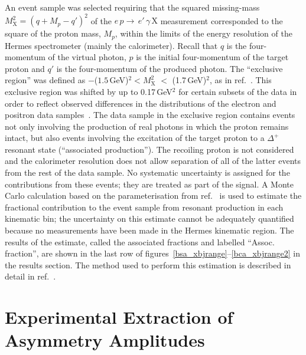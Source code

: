 \documentclass[11pt,a4paper]{article}
\begin{document}
An event sample was selected requiring
that the squared missing-mass $M_{\textrm{X}}^{2}=(q+M_{p}-q')^{2}$
of the $e\,p \rightarrow\, e'\,\gamma\, \textrm{X}$ measurement
corresponded to the square of the proton mass, $M_{p}$, within the limits of the
energy resolution of the H{\sc ermes} spectrometer (mainly the calorimeter). Recall that $q$ is the
four-momentum of the virtual photon, $p$ is the initial four-momentum
of the target proton and $q'$ is the four-momentum of the produced
photon. The ``exclusive region'' was defined as $-$($1.5$\,GeV)$^{2} <
M_{\textrm{X}}^{2}$ $<$ (1.7\,GeV)$^{2}$, as in
ref.~\cite{Air09}. This exclusive region was shifted by up to
0.17\,GeV$^{2}$ for certain subsets of the data in order to reflect observed differences in the distributions of the electron and positron data samples~\cite{Bur10}. 
The data sample in the exclusive region contains events not only involving the production of real photons in which the proton remains intact, but also
events involving the excitation of the target proton to a $\Delta^+$
resonant state (``associated production''). The recoiling proton is not considered and the calorimeter resolution does not allow separation of all of the latter events from the rest of the data sample.
No systematic uncertainty is assigned for the contributions from these
events; they are treated as part of the signal. A Monte Carlo
calculation based on the parameterisation from ref.~\cite{Bra76} is
used to estimate the fractional contribution to the event sample from resonant
production in each kinematic bin; the uncertainty on this estimate
cannot be adequately quantified because no measurements have been made
in the H{\sc ermes} kinematic region. The results of the estimate, called the associated fractions and labelled ``Assoc. fraction'', are shown in the last row of figures~\ref{bsa_xbjrange}--\ref{bca_xbjrange2} in the results section. The method used to perform this estimation is described in detail in
ref.~\cite{Air08}.

\section{Experimental Extraction of Asymmetry Amplitudes}
\end{document}
